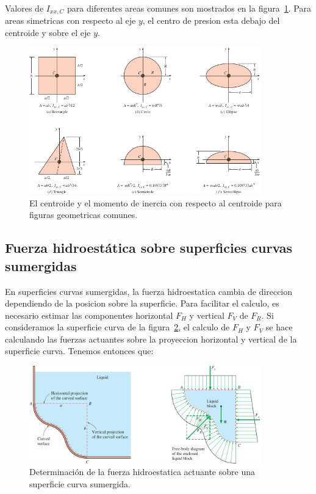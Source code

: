 \documentclass[10pt, oneside]{article}
\begin{document}
Valores de $I_{xx,C}$ para diferentes areas comunes son mostrados en la figura~\ref{centro}. Para areas simetricas con respecto al eje $y$, el centro de presion esta debajo del centroide y sobre el eje $y$.
\begin{figure}[h]
\centering
\includegraphics[width=10cm]{centro}
\caption{El centroide y el momento de inercia con respecto al centroide para figuras geometricas comunes.}
\label{centro}
\end{figure}


\subsection{Fuerza hidroest\'atica sobre superficies curvas sumergidas}
\label{hicu}
En superficies curvas sumergidas, la fuerza hidroestatica cambia de direccion dependiendo de la posicion sobre la superficie. Para facilitar el calculo, es necesario estimar las componentes horizontal $F_H$ y vertical $F_V$ de $F_R$. Si consideramos la superficie curva de la figura~\ref{cur1}, el calculo de $F_H$ y $F_V$ se hace calculando las fuerzas actuantes sobre la proyeccion horizontal y vertical de la superficie curva. Tenemos entonces que:

\begin{figure}[h]
\centering
\includegraphics[width=10cm]{cur1}
\caption{Determinaci\'on de la fuerza hidroestatica actuante sobre una superficie curva sumergida.}
\label{cur1}
\end{figure}
\end{document}
